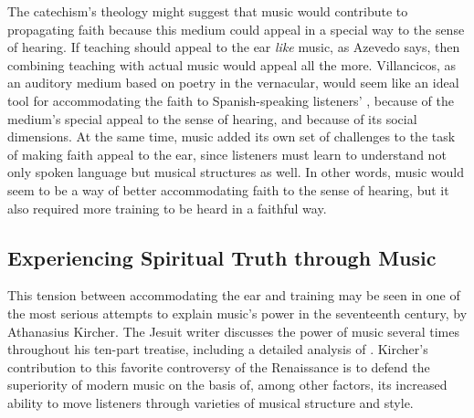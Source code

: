 The catechism's theology might suggest that music would contribute to
propagating faith because this medium could appeal in a special way to the sense
of hearing.
If teaching should appeal to the ear \emph{like} music, as Azevedo says, then
combining teaching with actual music would appeal all the more.
Villancicos, as an auditory medium based on poetry in the vernacular, would seem
like an ideal tool for accommodating the faith to Spanish-speaking listeners'
, because of the medium's special appeal to the
sense of hearing, and because of its social dimensions.
At the same time, music added its own set of challenges to the task of making
faith appeal to the ear, since listeners must learn to understand not only
spoken language but musical structures as well.
In other words, music would seem to be a way of better accommodating faith to
the sense of hearing, but it also required more training to be heard in a
faithful way.

\subsection{Experiencing Spiritual Truth through Music}

This tension between accommodating the ear and training may be seen in one of
the most serious attempts to explain music's power in the seventeenth century,
by Athanasius Kircher.
The Jesuit writer discusses the power of music several times throughout his
ten-part treatise, including a detailed analysis of .%
    \Autocite[, ]{Kircher:Musurgia}
Kircher's contribution to this favorite controversy of the Renaissance is to
defend the superiority of modern music on the basis of, among other factors, its
increased ability to move listeners through varieties of musical structure and
style.

